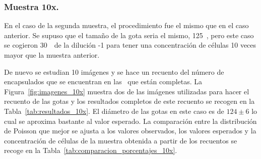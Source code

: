 \subsubsection{Muestra 10x.}\label{muestra10x}

En el caso de la segunda muestra, el procedimiento fue el mismo que en el caso anterior. Se supuso que el tamaño de la gota seria el  mismo, 125~\micrometro, pero este caso se cogieron 30~\micrometro\ de la dilución -1 para tener una concentración de células 10 veces mayor que la muestra anterior.

De nuevo se estudian 10 imágenes y se hace un recuento del número de encapsulados que se encuentran en las \gotas\ que están completas. La Figura~\ref{fig:imagenes_10x} muestra dos de las imágenes utilizadas para hacer el recuento de las gotas y los resultados completos de este recuento se recogen en la Tabla~\ref{tab:resultados_10x}. El diámetro de las gotas en este caso es de $124\pm6$ lo cual se aproxima bastante al valor esperado. La comparación entre la distribución de Poisson que mejor se ajusta a los valores observados, los valores esperados y la concentración de células de la muestra obtenida a partir de los recuentos se recoge en la Tabla~\ref{tab:comparacion_porcentajes_10x}.

